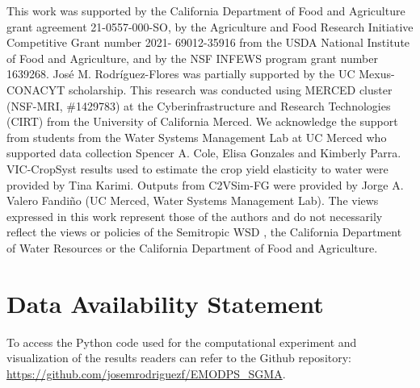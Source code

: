\documentclass[a4paper,fleqn]{cas-sc}
\begin{document}
This work was supported by the California Department of Food and Agriculture grant agreement 21-0557-000-SO, by the Agriculture and Food Research Initiative Competitive Grant number 2021- 69012-35916 from the USDA National Institute of Food and Agriculture, and by the NSF INFEWS program grant number 1639268. José M. Rodríguez-Flores was partially supported by the UC Mexus-CONACYT scholarship. This research was conducted using MERCED cluster (NSF-MRI, \#1429783) at the Cyberinfrastructure and Research Technologies (CIRT) from the University of California Merced. We acknowledge the support from students from the Water Systems Management Lab at UC Merced who supported data collection Spencer A. Cole, Elisa Gonzales and Kimberly Parra. VIC-CropSyst results used to estimate the crop yield elasticity to water were provided by Tina Karimi. Outputs from  C2VSim-FG were provided by Jorge A. Valero Fandiño (UC Merced, Water Systems Management Lab). The views expressed in this work represent those of the authors and do not necessarily reflect the views or policies of the Semitropic WSD , the California Department of Water Resources or the California Department of Food and Agriculture. 

\section*{Data Availability Statement}

To access the Python code used for the computational experiment and  visualization of the results readers can refer to the Github repository: \url{https://github.com/josemrodriguezf/EMODPS_SGMA}.

\printcredits


% 



\end{document}
